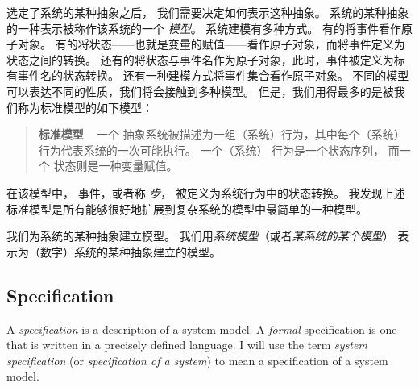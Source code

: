 \documentclass[fleqn,leqno]{article}
\begin{document}
\begin{ch}
  选定了系统的某种抽象之后，
  我们需要决定如何表示这种抽象。
  系统的某种抽象的一种表示被称作该系统的一个%
  \emph{模型}。
  系统建模有多种方式。
  有的将事件看作原子对象。
  有的将状态——也就是变量的赋值——看作原子对象，而将事件定义为状态之间的转换。
  还有的将状态与事件名作为原子对象，此时，事件被定义为标有事件名的状态转换。
  还有一种建模方式将事件集合看作原子对象。
  不同的模型可以表达不同的性质，我们将会接触到多种模型。
  但是，我们用得最多的是被我们称为标准模型的如下模型：
  \begin{quote}
    \textbf{标准模型} \  
    一个%
    抽象系统被描述为一组（系统）行为，其中每个（系统）行为代表系统的一次可能执行。
    一个（系统）%
    行为是一个状态序列，
    而一个%
    状态则是一种变量赋值。
  \end{quote}
  在该模型中，%
  事件，或者称%
  \emph{步}，
  被定义为系统行为中的状态转换。
  我发现上述标准模型是所有能够很好地扩展到复杂系统的模型中最简单的一种模型。

  我们为系统的某种抽象建立模型。
  我们用\emph{系统模型}（或者\emph{某系统的某个模型}）
  表示为（数字）系统的某种抽象建立的模型。
\end{ch}


%
\vspace{-\baselineskip}
\subsection{Specification}    
A \emph{specification} 
is a description of a system model.  A
\emph{formal} specification is one that is written in a precisely
defined language.  I will use the term \emph{system specification} (or
\emph{specification of a system}) to mean a specification of a system
model.  
\end{document}

